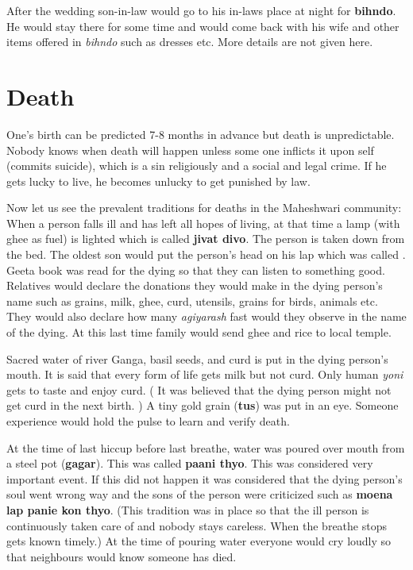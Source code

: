 After the wedding son-in-law would go to his in-laws place at night for
\textbf{bihndo}. He would stay there for some time and would come back with his
wife and other items offered in \textit{bihndo} such as dresses etc. More
details are not given here.

\par
\begin{center} \par\end{center}

\begin{center} \par\end{center}

\section{Death} 
One's birth can be predicted 7-8 months in advance but death is unpredictable.
Nobody knows when death will happen unless some one inflicts it upon self
(commits suicide), which is a sin religiously and a social and legal crime. If
he gets lucky to live, he becomes unlucky to get punished by law.

Now let us see the prevalent traditions for deaths in the Maheshwari community:
When a person falls ill and has left all hopes of living, at that time a lamp
(with ghee as fuel) is lighted which is called \textbf{jivat divo}. The person
is taken down from the bed. The oldest son would put the person's head on his
lap which was called . Geeta book was read for the dying so
that they can listen to something good. Relatives would declare the donations
they would make in the dying person's name such as grains, milk, ghee, curd,
utensils, grains for birds, animals etc. They would also declare how many
\textit{agiyarash} fast would they observe in the name of the dying. At this
last time family would send ghee and rice to local temple.

Sacred water of river Ganga, basil seeds, and curd is put in the dying person's
mouth. It is said that every form of life gets milk but not curd. Only human
\textit{yoni} gets to taste and enjoy curd. ( It was believed that the dying
person might not get curd in the next birth. ) A tiny gold grain (\textbf{tus})
was put in an eye. Someone experience would hold the pulse to learn and verify
death.

At the time of last hiccup before last breathe, water was poured over mouth
from a steel pot (\textbf{gagar}). This was called \textbf{paani thyo}. This
was considered very important event. If  this did not happen it was considered
that the dying person's soul went wrong way and the sons of the person were
criticized such as \textbf{moena lap panie kon thyo}. (This tradition was in
place so that the ill person is continuously taken care of and nobody stays
careless. When the breathe stops gets known timely.) At the time of pouring
water everyone would cry loudly so that neighbours would know someone has died.

